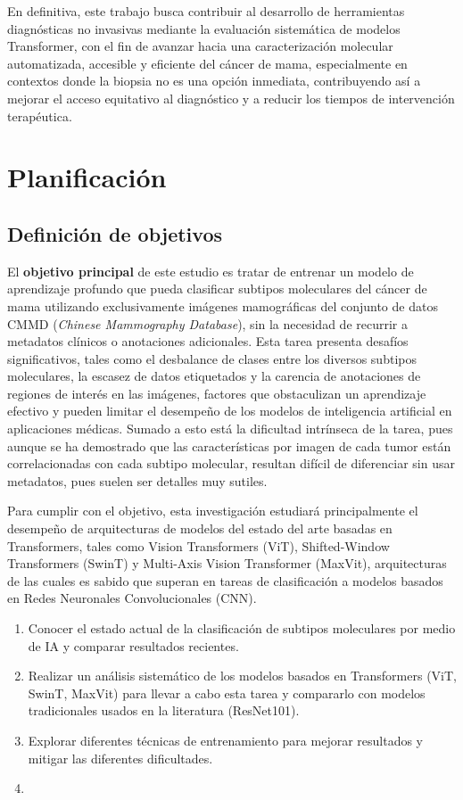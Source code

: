 \documentclass[a4paper,10pt]{book}
\begin{document}
En definitiva, este trabajo busca contribuir al desarrollo de herramientas diagnósticas no invasivas mediante la evaluación sistemática de modelos Transformer, con el fin de avanzar hacia una caracterización molecular automatizada, accesible y eficiente del cáncer de mama, especialmente en contextos donde la biopsia no es una opción inmediata, contribuyendo así a mejorar el acceso equitativo al diagnóstico y a reducir los tiempos de intervención terapéutica.

\section{Planificación}

\subsection{Definición de objetivos}

El \textbf{objetivo principal} de este estudio es tratar de entrenar un modelo de aprendizaje profundo que pueda clasificar subtipos moleculares del cáncer de mama utilizando exclusivamente imágenes mamográficas del conjunto de datos CMMD \cite{cai_online_2023} (\textit{Chinese Mammography Database}), sin la necesidad de recurrir a metadatos clínicos o anotaciones adicionales. Esta tarea presenta desafíos significativos, tales como el desbalance de clases entre los diversos subtipos moleculares, la escasez de datos etiquetados y la carencia de anotaciones de regiones de interés en las imágenes, factores que obstaculizan un aprendizaje efectivo y pueden limitar el desempeño de los modelos de inteligencia artificial en aplicaciones médicas. Sumado a esto está la dificultad intrínseca de la tarea, pues aunque se ha demostrado que las características por imagen de cada tumor están correlacionadas con cada subtipo molecular, resultan difícil de diferenciar sin usar metadatos, pues suelen ser detalles muy sutiles.

Para cumplir con el objetivo, esta investigación estudiará principalmente el desempeño de arquitecturas de modelos del estado del arte basadas en Transformers, tales como Vision Transformers (ViT), Shifted-Window Transformers (SwinT) y Multi-Axis Vision Transformer (MaxVit), arquitecturas  de las cuales es sabido que superan en tareas de clasificación a modelos basados en Redes Neuronales Convolucionales (CNN). 

\begin{enumerate}
    \item Conocer el estado actual de la clasificación de subtipos moleculares por medio de IA y comparar resultados recientes.
    \item Realizar un análisis sistemático de los modelos basados en Transformers (ViT, SwinT, MaxVit) para llevar a cabo esta tarea y compararlo con modelos tradicionales usados en la literatura (ResNet101).
    \item Explorar diferentes técnicas de entrenamiento para mejorar resultados y mitigar las diferentes dificultades.
    \item 
\end{enumerate}
\end{document}
